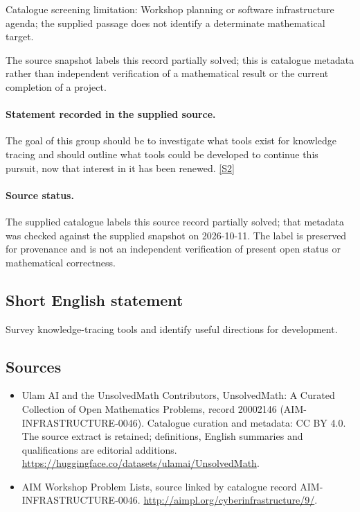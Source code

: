 \documentclass[11pt]{article}
\begin{document}
Catalogue screening limitation: Workshop planning or software infrastructure agenda; the supplied passage does not identify a determinate mathematical target.

The source snapshot labels this record partially solved; this is catalogue metadata rather than independent verification of a mathematical result or the current completion of a project.
\paragraph{Statement recorded in the supplied source.}
The goal of this group should be to investigate what tools exist for knowledge tracing and should outline what tools could be developed to continue this pursuit, now that interest in it has been renewed. \href{http://aimpl.org/cyberinfrastructure/9/}{[S2]}
\paragraph{Source status.}
The supplied catalogue labels this source record partially solved; that metadata was checked against the supplied snapshot on 2026-10-11. The label is preserved for provenance and is not an independent verification of present open status or mathematical correctness.
\subsection{Short English statement}
Survey knowledge-tracing tools and identify useful directions for development.
\subsection{Sources}
\begin{itemize}
\item[S1] Ulam AI and the UnsolvedMath Contributors, UnsolvedMath: A Curated Collection of Open Mathematics Problems, record 20002146 (AIM-INFRASTRUCTURE-0046). Catalogue curation and metadata: CC BY 4.0. The source extract is retained; definitions, English summaries and qualifications are editorial additions.
\url{https://huggingface.co/datasets/ulamai/UnsolvedMath}.
\item[S2] AIM Workshop Problem Lists, source linked by catalogue record AIM-INFRASTRUCTURE-0046.
\url{http://aimpl.org/cyberinfrastructure/9/}.
\end{itemize}
\end{document}
